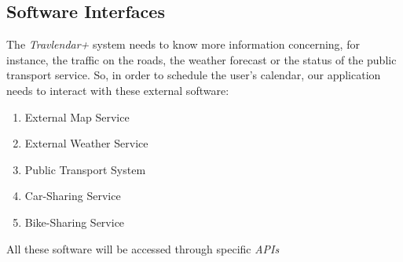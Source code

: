 \subsection{Software Interfaces}
The \emph{Travlendar+} system needs to know more information concerning, for instance, the traffic on the roads, the weather forecast or the status of the public transport service.
So, in order to schedule the user's calendar, our application needs to interact with these external software:
\begin{enumerate}
    \item External Map Service
    \item External Weather Service
    \item Public Transport System
    \item Car-Sharing Service
    \item Bike-Sharing Service
\end{enumerate}
All these software will be accessed through specific \emph{APIs}